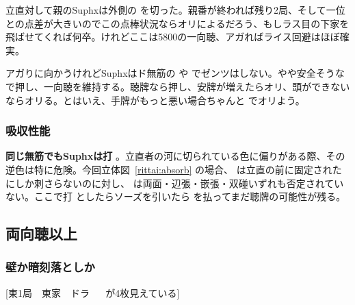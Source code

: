 \documentclass[10pt, twocolumn]{article}
\begin{document}
立直対して親のSuphxは外側の  を切った\citep[][pp.~52--53]{suphx}。親番が終われば残り2局、そして一位との点差が大きいのでこの点棒状況ならオリによるだろう、もしラス目の下家を飛ばせてくれば何卒。けれどここは5800の一向聴、アガればライス回避はほぼ確実。

アガりに向かうけれどSuphxはド無筋の  や  でゼンツはしない。やや安全そうな  で押し、一向聴を維持する。聴牌なら押し、安牌が増えたらオリ、頭ができないならオリる。とはいえ、手牌がもっと悪い場合ちゃんと  でオリよう。

\subsubsection*{吸収性能}

\begin{rittai}[h]
  \centering
  
  
  \caption{親の立直を受けている場面}
  \label{rittai:absorb}
\end{rittai}

\textbf{同じ無筋でもSuphxは打 }\citep[][pp.~54--55]{suphx}。立直者の河に切られている色に偏りがある際、その逆色は特に危険。今回立体図~\ref{rittai:absorb} の場合、 は立直の前に固定された  にしか刺さらないのに対し、 は両面・辺張・嵌張・双碰いずれも否定されていない。ここで打  としたらソーズを引いたら  を払ってまだ聴牌の可能性が残る。


\subsection{両向聴以上}

\subsubsection*{壁か暗刻落としか}

[東1局　東家　ドラ 　 が4枚見えている]
\end{document}
